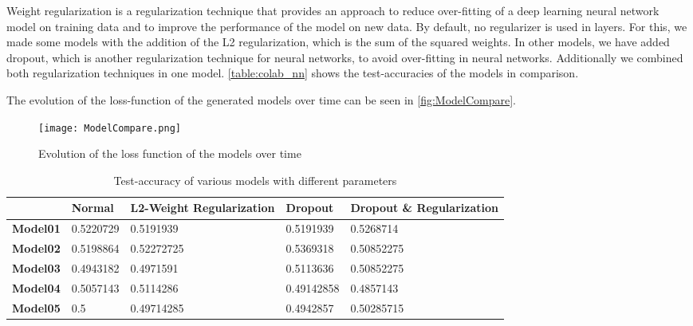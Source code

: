 Weight regularization is a regularization technique that provides an approach to reduce over-fitting of a deep learning neural network model on training data and to improve the performance of the model on new data.\newline
By default, no regularizer is used in layers. For this, we made some models with the addition of the L2 regularization, which is the sum of the squared weights.\newline \newline
In other models, we have added dropout, which is another regularization technique for neural networks, to avoid over-fitting in neural networks. Additionally we combined both regularization techniques in one model. \autoref{table:colab_nn} shows the test-accuracies of the models in comparison.

The evolution of the loss-function of the generated models over time can be seen in \autoref{fig:ModelCompare}.

\begin{figure}[H]
\begin{center}
\texttt{[image: ModelCompare.png]}
\end{center}
\caption{Evolution of the loss function of the models over time}
\label{fig:ModelCompare}
\end{figure}

\begin{table}
\centering
\label{table:colab_nn}
\begin{tabular}{|p{2cm}|p{2cm}|p{3cm}|p{2cm}|p{3cm}|}
\hline
 & \textbf{Normal} & \textbf{L2-Weight \newline Regularization} & \textbf{Dropout} & \textbf{Dropout \& \newline Regularization} \\ \hline
\textbf{Model01} & 0.5220729 & 0.5191939 & 0.5191939 & 0.5268714 \\ \hline
\textbf{Model02} & 0.5198864 & 0.52272725 & 0.5369318 & 0.50852275 \\ \hline
\textbf{Model03} & 0.4943182 & 0.4971591 & 0.5113636 & 0.50852275 \\ \hline
\textbf{Model04} & 0.5057143 & 0.5114286 & 0.49142858 & 0.4857143 \\ \hline
\textbf{Model05} & 0.5 & 0.49714285 & 0.4942857 & 0.50285715 \\ \hline

\end{tabular}
\caption{Test-accuracy of various models with different parameters}
\label{table:colab_nn}
\end{table}

